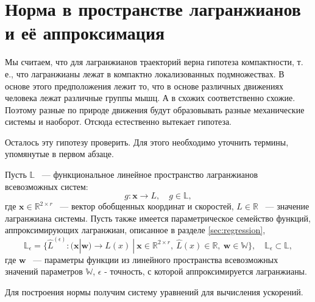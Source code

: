 \documentclass[12pt, twoside]{article}
\begin{document}
\section{Норма в пространстве лагранжианов и её аппроксимация}
Мы считаем, что для лагранжианов траекторий верна гипотеза компактности, т. е., что лагранжианы лежат в компактно локализованных подмножествах. В основе этого предположения лежит то, что в основе различных движениях человека лежат различные группы мышц. А в схожих соответственно схожие. Поэтому разные по природе движения будут образовывать разные механические системы и наоборот. Отсюда естественно вытекает гипотеза.

Осталось эту гипотезу проверить. Для этого необходимо уточнить термины, упомянутые в первом абзаце. 

Пусть $\mathbb{L}$ ~--- функциональное линейное пространство лагранжианов всевозможных систем:
\[ 
g: \mathbf{x} \to L, \quad g \in \mathbb{L},
\] 
где $\mathbf{x} \in \mathbb{R}^{2 \times r}$ ~--- вектор обобщенных координат и скоростей, $L \in \mathbb{R}$ ~--- значение лагранжиана системы. Пусть также имеется параметрическое семейство функций, аппроксимирующих лагранжиан, описанное в разделе \ref{sec:regression},
\[
 \mathbb{L}_{\epsilon} = \{ \hat{L}^{(\epsilon)} \colon (\mathbf{x} | \mathbf{w}) \to \hat{L}(x) \ | \ \mathbf{x} \in \mathbb{R}^{2 \times r}, \ \hat{L}(x)  \in \mathbb{R}, 
 \ \mathbf{w} \in \mathbb{W} \}, \quad \mathbb{L}_{\epsilon} \subset \mathbb{L},
\]
где $\mathbf{w}$ ~--- параметры функции из линейного пространства всевозможных значений параметров $\mathbb{W}$, $\epsilon$ - точность, с которой аппроксимируется лагранжианы.

Для построения нормы получим систему уравнений для вычисления ускорений.
\end{document}
